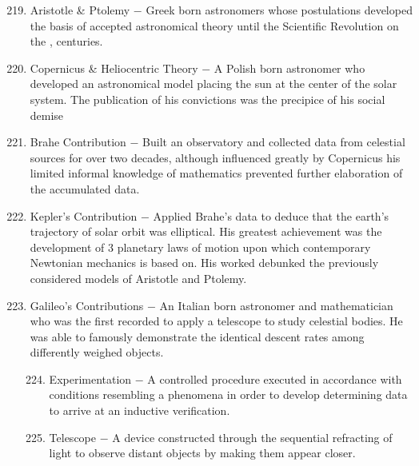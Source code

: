 \documentclass[12pt]{article}
\begin{document}
\begin{enumerate}
\begin{enumerate}[label=\arabic{*}.]
\setcounter{enumii}{218}

\item Aristotle \& Ptolemy $-$ Greek born astronomers whose postulations developed the basis of accepted astronomical theory until the Scientific Revolution on the ,  centuries.

\item Copernicus \& Heliocentric Theory $-$ A Polish born astronomer who developed an astronomical model placing the sun at the center of the solar system. The publication of his convictions was the precipice of his social demise

\item Brahe Contribution $-$ Built an observatory and collected data from celestial sources for over two decades, although influenced greatly by Copernicus his limited informal knowledge of mathematics prevented further elaboration of the accumulated data.

\item Kepler's Contribution $-$ Applied Brahe's data to deduce that the earth's trajectory of solar orbit was elliptical. His greatest achievement was the development of 3 planetary laws of motion upon which contemporary Newtonian mechanics is based on. His worked debunked the previously considered models of Aristotle and Ptolemy.

\item Galileo's Contributions $-$ An Italian born astronomer and mathematician who was the first recorded to apply a telescope to study celestial bodies. He was able to famously demonstrate the identical descent rates among differently weighed objects.

\begin{enumerate}[label=\arabic{*}.]
\setcounter{enumiii}{223}

\item Experimentation $-$ A controlled procedure executed in accordance with conditions resembling a phenomena in order to develop determining data to arrive at an inductive verification.

\item Telescope $-$ A device constructed through the sequential refracting of light to observe distant objects by making them appear closer.

\end{enumerate}



\end{enumerate}
\setcounter{enumi}{225}


\end{enumerate}
\end{document}

